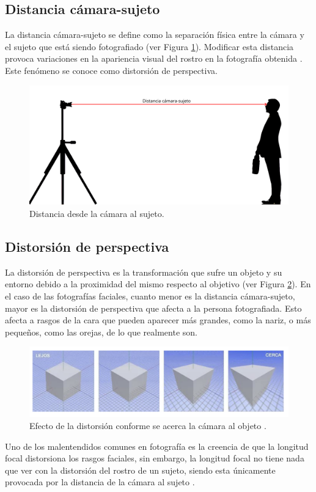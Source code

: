 \subsection*{Distancia cámara-sujeto}

La distancia cámara-sujeto se define como la separación física entre la cámara y el sujeto que está siendo fotografiado (ver Figura \ref{fig14}). Modificar esta distancia provoca variaciones en la apariencia visual del rostro en la fotografía obtenida \cite{43}. Este fenómeno se conoce como distorsión de perspectiva.

\begin{figure}[h]
	\centering
	\includegraphics[scale=0.1]{imagenes/cap2/SCD_final.png}
	\caption[Distancia desde la cámara al sujeto.]{Distancia desde la cámara al sujeto.}
	\label{fig14}
\end{figure}

\subsection*{Distorsión de perspectiva}

La distorsión de perspectiva \cite{8,51} es la transformación que sufre un objeto y su entorno debido a la proximidad del mismo respecto al objetivo (ver Figura \ref{fig15}). En el caso de las fotografías faciales, cuanto menor es la distancia cámara-sujeto, mayor es la distorsión de perspectiva que afecta a la persona fotografiada. Esto afecta a rasgos de la cara que pueden aparecer más grandes, como la nariz, o más pequeños, como las orejas, de lo que realmente son.

\begin{figure}[h]
	\centering
	\includegraphics[scale=0.5]{imagenes/cap2/distorsion.png}
	\caption[Efectos de la distorsión según distancia.]{Efecto de la distorsión conforme se acerca la cámara al objeto \cite{51}.}
	\label{fig15}
\end{figure}

Uno de los malentendidos comunes en fotografía es la creencia de que la longitud focal distorsiona los rasgos faciales, sin embargo, la longitud focal  no tiene nada que ver con la distorsión del rostro de un sujeto, siendo esta únicamente provocada por la distancia de la cámara al sujeto \cite{52}.


